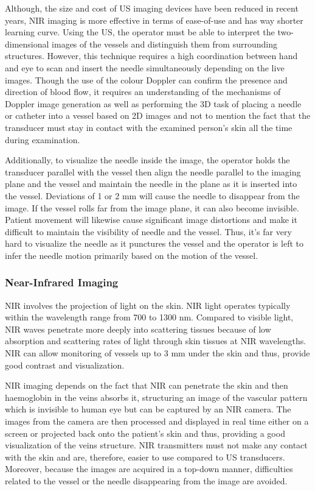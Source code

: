 Although, the size and cost of US imaging devices have been reduced in recent years, NIR imaging is more effective in terms of ease-of-use and has way shorter learning curve. Using the US, the operator must be able to interpret the two-dimensional images of the vessels and distinguish them from surrounding structures. However, this technique requires a high coordination between hand and eye to scan and insert the needle simultaneously depending on the live images. Though the use of the colour Doppler can confirm the presence and direction of blood flow, it requires an understanding of the mechanisms of Doppler image generation as well as performing the 3D task of placing a needle or catheter into a vessel based on 2D images and not to mention the fact that the transducer must stay in contact with the examined person’s skin all the time during examination.

Additionally, to visualize the needle inside the image, the operator holds the transducer parallel with the vessel then align the needle parallel to the imaging plane and the vessel and maintain the needle in the plane as it is inserted into the vessel. Deviations of 1 or 2 mm will cause the needle to disappear from the image. If the vessel rolls far from the image plane, it can also become invisible. Patient movement will likewise cause significant image distortions and make it difficult to maintain the visibility of needle and the vessel. Thus, it's far very hard to visualize the needle as it punctures the vessel and the operator is left to infer the needle motion primarily based on the motion of the vessel.

\subsubsection{Near-Infrared Imaging}

NIR involves the projection of light on the skin. NIR light operates typically within the wavelength range from 700 to 1300 nm. Compared to visible light, NIR waves penetrate more deeply into scattering tissues because of low absorption and scattering rates of light through skin tissues at NIR wavelengths. NIR can allow monitoring of vessels up to 3 mm under the skin and thus, provide good contrast and visualization.

NIR imaging depends on the fact that NIR can penetrate the skin and then haemoglobin in the veins absorbs it, structuring an image of the vascular pattern which is invisible to human eye but can be captured by an NIR camera. The images from the camera are then processed and displayed in real time either on a screen or projected back onto the patient’s skin and thus, providing a good visualization of the veins structure. NIR transmitters must not make any contact with the skin and are, therefore, easier to use compared to US transducers. Moreover, because the images are acquired in a top-down manner, difficulties related to the vessel or the needle disappearing from the image are avoided.

